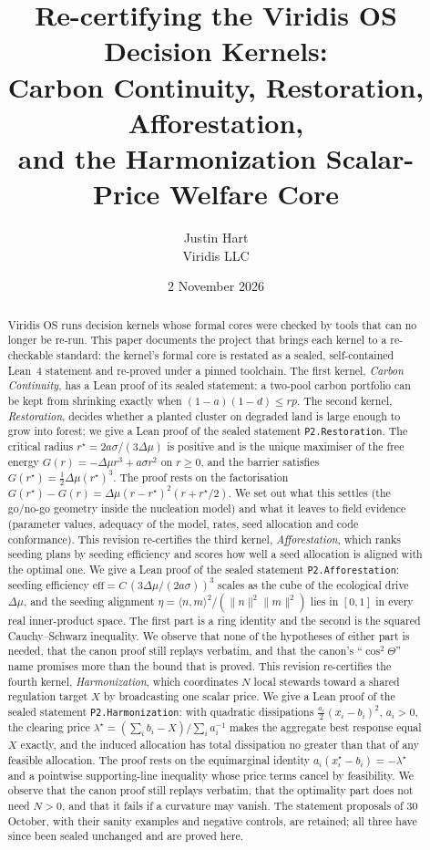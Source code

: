\documentclass[11pt]{article}
\title{Re-certifying the Viridis OS Decision Kernels:\\ Carbon Continuity, Restoration, Afforestation,\\ and the Harmonization Scalar-Price Welfare Core}
\author{Justin Hart\\ Viridis LLC}
\date{2 November 2026}
\theoremstyle{definition}
\theoremstyle{remark}
\begin{document}
\maketitle

\begin{abstract}
Viridis OS runs decision kernels whose formal cores were checked by tools that can no longer be re-run.
This paper documents the project that brings each kernel to a re-checkable standard: the kernel's formal core is restated as a
sealed, self-contained Lean~4 statement and re-proved under a pinned toolchain.
The first kernel, \emph{Carbon Continuity}, has a Lean proof of its sealed statement: a two-pool carbon portfolio can be kept
from shrinking exactly when $(1-a)(1-d)\le rp$.
The second kernel, \emph{Restoration}, decides whether a planted cluster on degraded
land is large enough to grow into forest; we give a Lean proof of the sealed statement \texttt{P2.Restoration}.
The critical radius $r^\star=2a\sigma/(3\Delta\mu)$ is positive and is the unique maximiser of the free energy
$G(r)=-\Delta\mu r^3+a\sigma r^2$ on $r\ge 0$, and the barrier satisfies $G(r^\star)=\tfrac12\Delta\mu (r^\star)^3$.
The proof rests on the factorisation $G(r^\star)-G(r)=\Delta\mu(r-r^\star)^2(r+r^\star/2)$.
We set out what this settles (the go/no-go geometry inside the nucleation model) and what it leaves to field
evidence (parameter values, adequacy of the model, rates, seed allocation and code conformance).
This revision re-certifies the third kernel, \emph{Afforestation}, which ranks seeding plans by seeding efficiency
and scores how well a seed allocation is aligned with the optimal one.
We give a Lean proof of the sealed statement \texttt{P2.Afforestation}: seeding efficiency
$\mathrm{eff}=C\,(3\Delta\mu/(2a\sigma))^3$ scales as the cube of the ecological drive $\Delta\mu$, and the seeding
alignment $\eta=\langle n,m\rangle^2/(\|n\|^2\|m\|^2)$ lies in $[0,1]$ in every real inner-product space.
The first part is a ring identity and the second is the squared Cauchy--Schwarz inequality.
We observe that none of the hypotheses of either part is needed, that the canon proof still replays verbatim,
and that the canon's ``$\cos^2\Theta$'' name promises more than the bound that is proved.
This revision re-certifies the fourth kernel, \emph{Harmonization}, which coordinates $N$ local stewards toward a shared
regulation target $X$ by broadcasting one scalar price.
We give a Lean proof of the sealed statement \texttt{P2.Harmonization}: with quadratic dissipations
$\tfrac{a_i}{2}(x_i-b_i)^2$, $a_i>0$, the clearing price $\lambda^\star=(\sum_i b_i-X)/\sum_i a_i^{-1}$ makes the aggregate
best response equal $X$ exactly, and the induced allocation has total dissipation no greater than that of any feasible allocation.
The proof rests on the equimarginal identity $a_i(x^\star_i-b_i)=-\lambda^\star$ and a pointwise supporting-line inequality whose
price terms cancel by feasibility. We observe that the canon proof still replays verbatim, that the optimality part does not need
$N>0$, and that it fails if a curvature may vanish.
The statement proposals of 30 October, with their sanity examples and negative controls, are retained; all three have
since been sealed unchanged and are proved here.
\end{abstract}
\end{document}
